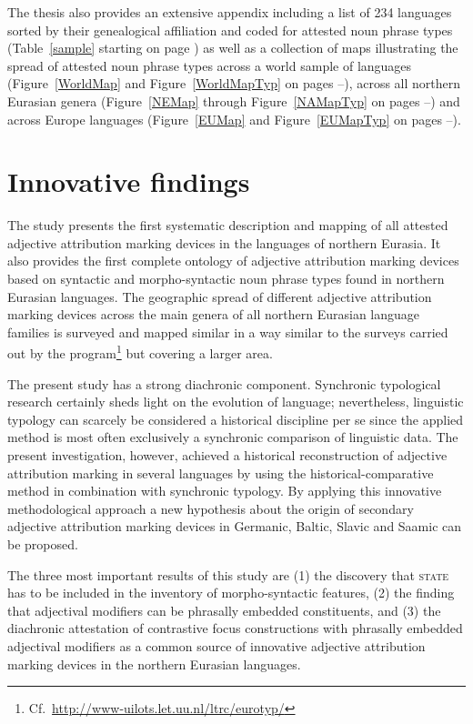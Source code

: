 \noindent The thesis also provides an extensive appendix including a list of 234 languages sorted by their genealogical affiliation and coded for attested noun phrase types (Table~\ref{sample} starting on page \pageref{sample}) as well as a collection of maps illustrating the spread of attested noun phrase types across a world sample of languages (Figure~\ref{WorldMap} and Figure~\ref{WorldMapTyp} on pages \pageref{WorldMap}–\pageref{WorldMapTyp}), across all northern Eurasian genera (Figure~\ref{NEMap} through Figure~\ref{NAMapTyp} on pages \pageref{NEMap}–\pageref{NAMapTyp}) and across Europe languages (Figure~\ref{EUMap} and Figure~\ref{EUMapTyp} on pages \pageref{EUMap}–\pageref{EUMapTyp}).

\section{Innovative findings}
The study presents the first systematic description and mapping of all attested adjective attribution marking devices in the languages of northern Eurasia. It also provides the first complete ontology of adjective attribution marking devices based on syntactic and morpho-syntactic noun phrase types found in northern Eurasian languages. The geographic spread of different adjective attribution marking devices across the main genera of all northern Eurasian language families is surveyed and mapped similar in a way similar to the surveys carried out by the  program\footnote{Cf.~\url{http://www-uilots.let.uu.nl/ltrc/eurotyp/}} but covering a larger area. %

The present study has a strong diachronic component. Synchronic typological research certainly sheds light on the evolution of language; nevertheless, linguistic typology can scarcely be considered a historical discipline per se since the applied method is most often exclusively a synchronic comparison of linguistic data. The present investigation, however, achieved a historical reconstruction of adjective attribution marking in several languages by using the historical-comparative method in combination with synchronic typology. By applying this innovative methodological approach a new hypothesis about the origin of secondary adjective attribution marking devices in Germanic, Baltic, Slavic and Saamic can be proposed. 

The three most important results of this study are (1) the discovery that \textsc{state} has to be included in the inventory of morpho-syntactic features, (2) the finding that adjectival modifiers can be phrasally embedded constituents, and (3) the diachronic attestation of contrastive focus constructions with phrasally embedded adjectival modifiers as a common source of innovative adjective attribution marking devices in the northern Eurasian languages.

